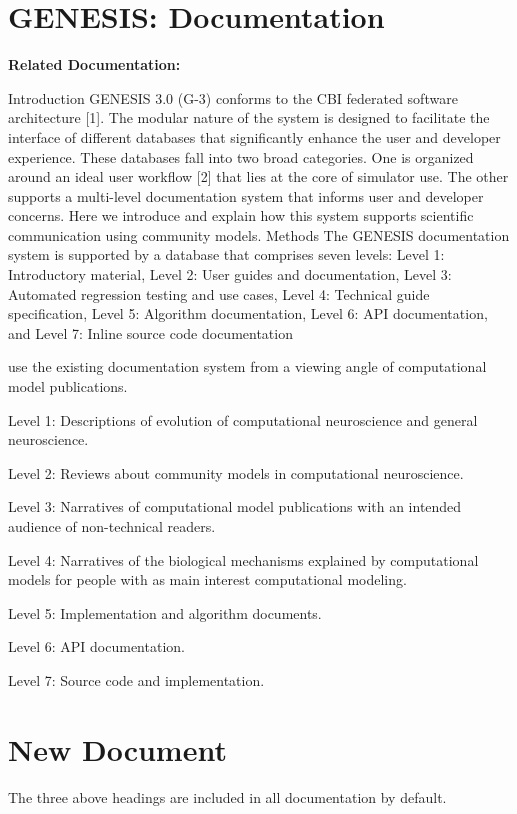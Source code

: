 \documentclass[12pt]{article}
\begin{document}
\section*{GENESIS: Documentation}

{\bf Related Documentation:}


Introduction
GENESIS 3.0 (G-3) conforms to the CBI federated software architecture [1]. The modular nature of the system is designed to facilitate the interface of different databases that significantly enhance the user and developer experience. These databases fall into two broad categories. One is organized around an ideal user workflow [2] that lies at the core of simulator use. The other supports a multi-level documentation system that informs user and developer concerns. Here we introduce and explain how this system supports scientific communication using community models.
Methods
The GENESIS documentation system is supported by a database that comprises seven levels: Level 1: Introductory material, Level 2: User guides and documentation, Level 3: Automated regression testing and use cases, Level 4: Technical guide specification, Level 5: Algorithm documentation, Level 6: API documentation, and Level 7: Inline source code documentation


use the existing documentation system from a viewing angle of computational model publications.

Level 1: Descriptions of evolution of computational neuroscience and
general neuroscience.

Level 2: Reviews about community models in computational neuroscience.

Level 3: Narratives of computational model publications with an
intended audience of non-technical readers.

Level 4: Narratives of the biological mechanisms explained by
computational models for people with as main interest computational
modeling.

Level 5: Implementation and algorithm documents.

Level 6: API documentation.

Level 7: Source code and implementation.


\section*{New Document}

The three above headings are included in all documentation by default.
\end{document}
